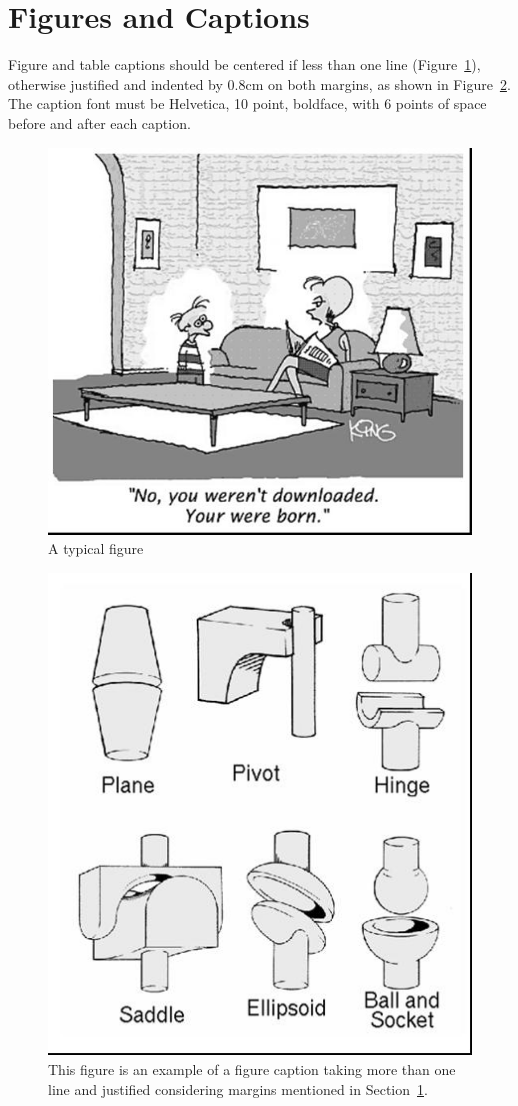 \documentclass[12pt]{article}
\begin{document}

\section{Figures and Captions}\label{sec:figs}

Figure and table captions should be centered if less than one line
(Figure~\ref{fig:exampleFig1}), otherwise justified and indented by 0.8cm on
both margins, as shown in Figure~\ref{fig:exampleFig2}. The caption font must
be Helvetica, 10 point, boldface, with 6 points of space before and after each
caption.

\begin{figure}[ht]
\centering
\includegraphics[width=.5\textwidth]{fig1.jpg}
\caption{A typical figure}
\label{fig:exampleFig1}
\end{figure}

\begin{figure}[ht]
\centering
\includegraphics[width=.3\textwidth]{fig2.jpg}
\caption{This figure is an example of a figure caption taking more than one
  line and justified considering margins mentioned in Section~\ref{sec:figs}.}
\label{fig:exampleFig2}
\end{figure}
\end{document}
